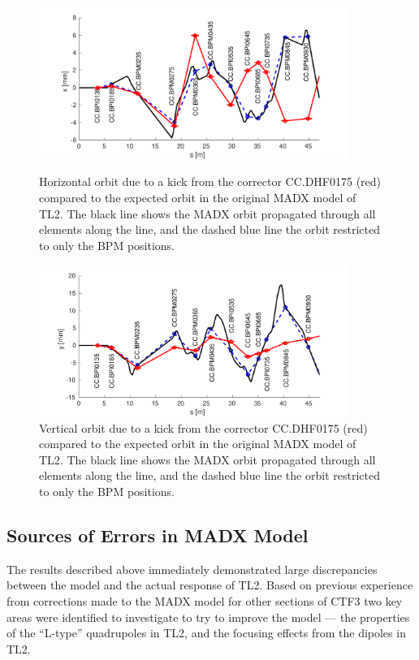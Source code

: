 \begin{figure}
  \centering
  \includegraphics[width=0.9\textwidth]{Figures/optics/modelOriginalH}
  \caption{Horizontal orbit due to a kick from the corrector CC.DHF0175 (red) compared to the expected orbit in the original MADX model of TL2. The black line shows the MADX orbit propagated through all elements along the line, and the dashed blue line the orbit restricted to only the BPM positions.}
  \label{f:modelOriginalH}
  \includegraphics[width=0.9\textwidth]{Figures/optics/modelOriginalV}
  \caption{Vertical orbit due to a kick from the corrector CC.DHF0175 (red) compared to the expected orbit in the original MADX model of TL2. The black line shows the MADX orbit propagated through all elements along the line, and the dashed blue line the orbit restricted to only the BPM positions.}
  \label{f:modelOriginalV}
\end{figure}

\subsection{Sources of Errors in MADX Model}
\label{ss:modelErrorSources}

The results described above immediately demonstrated large discrepancies between the model and the actual response of TL2. Based on previous experience from corrections made to the MADX model for other sections of CTF3 \cite{benOptics} two key areas were identified to investigate to try to improve the model --- the properties of the ``L-type'' quadrupoles in TL2, and the focusing effects from the dipoles in TL2.

